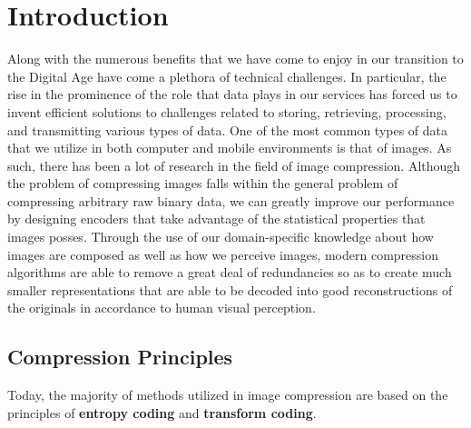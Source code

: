 \documentclass[review,onefignum,onetabnum]{siamart190516}
\begin{document}
\maketitle

\begin{abstract}
  \lipsum[1]
\end{abstract}

\section{Introduction}
Along with the numerous benefits that we have come to enjoy in our transition to the Digital Age
have come a plethora of technical challenges. In particular, the rise in the prominence
of the role that data plays in our services has forced us to invent efficient solutions 
to challenges related to storing, retrieving, processing, and transmitting various types of 
data. One of the most common types of data that we utilize in both computer and mobile environments
is that of images. As such, there has been a lot of research in the field of image compression.
Although the problem of compressing images falls within the general problem of compressing arbitrary
raw binary data, we can greatly improve our performance by designing encoders that take 
advantage of the statistical properties that images posses. Through the use of our domain-specific
knowledge about how images are composed as well as how we perceive images, 
modern compression algorithms are able to remove a great deal of redundancies
so as to create much smaller representations that are able to be decoded into 
good reconstructions of the originals in accordance to human visual perception.

\subsection{Compression Principles}

Today, the majority of methods utilized in image compression are based on the
principles of \textbf{entropy coding} and \textbf{transform coding}. 
\end{document}
